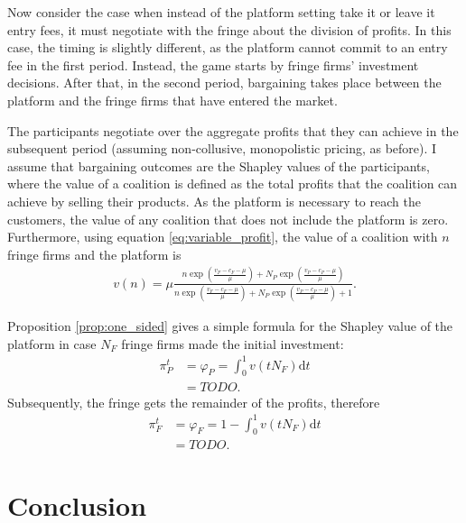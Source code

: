 \documentclass[a4paper]{article}
\newcommand{\dt}{\mathrm{d}t}
\begin{document}
Now consider the case when instead of the platform setting take it or leave it entry fees, it must negotiate with the fringe about the division of profits.
In this case, the timing is slightly different, as the platform cannot commit to an entry fee in the first period.
Instead, the game starts by fringe firms' investment decisions.
After that, in the second period, bargaining takes place between the platform and the fringe firms that have entered the market.


The participants negotiate over the aggregate profits that they can achieve in the subsequent period (assuming non-collusive, monopolistic pricing, as before).
I assume that bargaining outcomes are the Shapley values of the participants, where the value of a coalition is defined as the total profits that the coalition can achieve by selling their products.
As the platform is necessary to reach the customers, the value of any coalition that does not include the platform is zero.
Furthermore, using equation \eqref{eq:variable_profit}, the value of a coalition with $n$ fringe firms and the platform is
\begin{align*}
    v(n) = \mu \frac{n \exp \left( \frac{v_F - c_F - \mu}{\mu} \right) + N_P \exp \left( \frac{v_P - c_P - \mu}{\mu} \right)}{n \exp \left( \frac{v_F - c_F - \mu}{\mu} \right) + N_P \exp \left( \frac{v_P - c_P - \mu}{\mu} \right) + 1}.
\end{align*}

Proposition \ref{prop:one_sided} gives a simple formula for the Shapley value of the platform in case $N_F$ fringe firms made the initial investment:
\begin{align*}
    \pi^t_P &= \varphi_P = \int_0^1 v(tN_F) \dt \\
            &= TODO.
\end{align*}
Subsequently, the fringe gets the remainder of the profits, therefore
\begin{align*}
    \pi^t_F &= \varphi_F =  1 - \int_0^1 v(tN_F) \dt \\
            &= TODO.
\end{align*}


\section{Conclusion}
\end{document}
